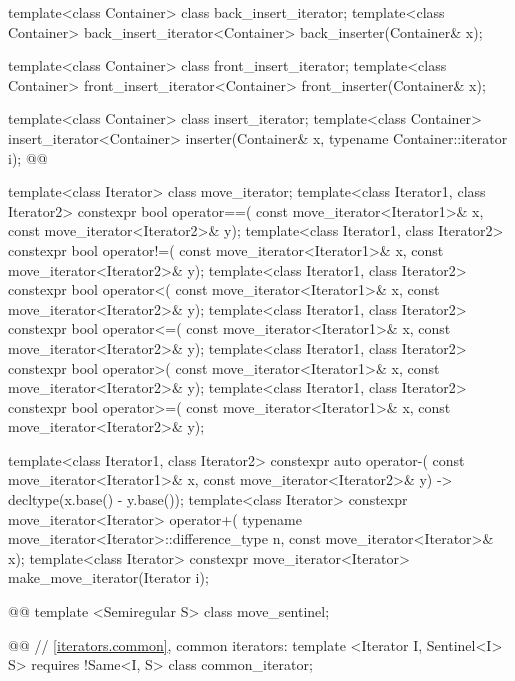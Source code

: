 \begin{codeblock}
{  template<class Container> class back_insert_iterator;
  template<class Container>
    back_insert_iterator<Container> back_inserter(Container& x);

  template<class Container> class front_insert_iterator;
  template<class Container>
    front_insert_iterator<Container> front_inserter(Container& x);

  template<class Container> class insert_iterator;
  template<class Container>
    insert_iterator<Container> inserter(Container& x, typename Container::iterator i);
  @@

  template<class Iterator> class move_iterator;
  template<class Iterator1, class Iterator2>
    constexpr bool operator==(
      const move_iterator<Iterator1>& x, const move_iterator<Iterator2>& y);
  template<class Iterator1, class Iterator2>
    constexpr bool operator!=(
      const move_iterator<Iterator1>& x, const move_iterator<Iterator2>& y);
  template<class Iterator1, class Iterator2>
    constexpr bool operator<(
      const move_iterator<Iterator1>& x, const move_iterator<Iterator2>& y);
  template<class Iterator1, class Iterator2>
    constexpr bool operator<=(
      const move_iterator<Iterator1>& x, const move_iterator<Iterator2>& y);
  template<class Iterator1, class Iterator2>
    constexpr bool operator>(
      const move_iterator<Iterator1>& x, const move_iterator<Iterator2>& y);
  template<class Iterator1, class Iterator2>
    constexpr bool operator>=(
      const move_iterator<Iterator1>& x, const move_iterator<Iterator2>& y);

  template<class Iterator1, class Iterator2>
    constexpr auto operator-(
    const move_iterator<Iterator1>& x,
    const move_iterator<Iterator2>& y) -> decltype(x.base() - y.base());
  template<class Iterator>
    constexpr move_iterator<Iterator> operator+(
      typename move_iterator<Iterator>::difference_type n, const move_iterator<Iterator>& x);
  template<class Iterator>
    constexpr move_iterator<Iterator> make_move_iterator(Iterator i);

  @@
  template <Semiregular S> class move_sentinel;

  @@
  // \ref{iterators.common}, common iterators:
  template <Iterator I, Sentinel<I> S>
    requires !Same<I, S>
  class common_iterator;

}
\end{codeblock}
